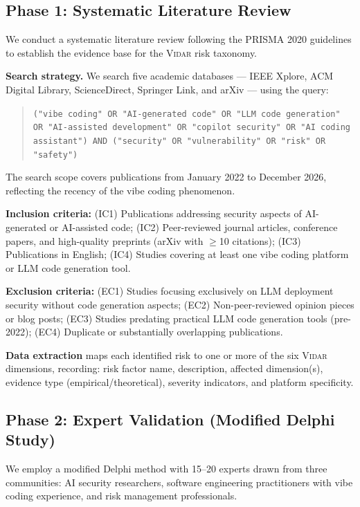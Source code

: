 \documentclass[preprint,review,12pt]{elsarticle}
\newcommand{\vidar}{\textsc{Vidar}}
\begin{document}
\subsection{Phase 1: Systematic Literature Review}
\label{subsec:phase1}

We conduct a systematic literature review following the PRISMA 2020 guidelines \cite{page2021prisma} to establish the evidence base for the \vidar{} risk taxonomy.

\textbf{Search strategy.} We search five academic databases --- IEEE Xplore, ACM Digital Library, ScienceDirect, Springer Link, and arXiv --- using the query:

\begin{quote}
\small
\texttt{("vibe coding" OR "AI-generated code" OR "LLM code generation" OR "AI-assisted development" OR "copilot security" OR "AI coding assistant") AND ("security" OR "vulnerability" OR "risk" OR "safety")}
\end{quote}

The search scope covers publications from January 2022 to December 2026, reflecting the recency of the vibe coding phenomenon.

\textbf{Inclusion criteria:} (IC1) Publications addressing security aspects of AI-generated or AI-assisted code; (IC2) Peer-reviewed journal articles, conference papers, and high-quality preprints (arXiv with $\geq$10 citations); (IC3) Publications in English; (IC4) Studies covering at least one vibe coding platform or LLM code generation tool.

\textbf{Exclusion criteria:} (EC1) Studies focusing exclusively on LLM deployment security without code generation aspects; (EC2) Non-peer-reviewed opinion pieces or blog posts; (EC3) Studies predating practical LLM code generation tools (pre-2022); (EC4) Duplicate or substantially overlapping publications.

\textbf{Data extraction} maps each identified risk to one or more of the six \vidar{} dimensions, recording: risk factor name, description, affected dimension(s), evidence type (empirical/theoretical), severity indicators, and platform specificity.


\subsection{Phase 2: Expert Validation (Modified Delphi Study)}
\label{subsec:phase2}

We employ a modified Delphi method \cite{linstone1975delphi, diamond2014defining} with 15--20 experts drawn from three communities: AI security researchers, software engineering practitioners with vibe coding experience, and risk management professionals.
\end{document}
